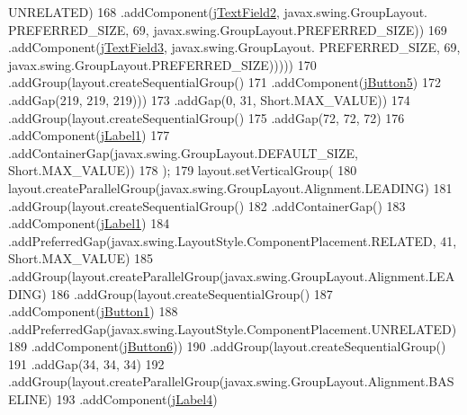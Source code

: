 \begin{DoxyCode}
      UNRELATED)
168                                         .addComponent(\mbox{\hyperlink{class_interfaz_package_1_1_consulta_busqueda_aa92702c5bdc2128ce8e45ce2edd99543}{jTextField2}}, javax.swing.GroupLayout.
      PREFERRED\_SIZE, 69, javax.swing.GroupLayout.PREFERRED\_SIZE))
169                                     .addComponent(\mbox{\hyperlink{class_interfaz_package_1_1_consulta_busqueda_a1898d78ec07cfb8e5e74b50bce3e6239}{jTextField3}}, javax.swing.GroupLayout.
      PREFERRED\_SIZE, 69, javax.swing.GroupLayout.PREFERRED\_SIZE)))))
170                     .addGroup(layout.createSequentialGroup()
171                         .addComponent(\mbox{\hyperlink{class_interfaz_package_1_1_consulta_busqueda_a92a758e63cc825dd1292869d625115dd}{jButton5}})
172                         .addGap(219, 219, 219)))
173                 .addGap(0, 31, Short.MAX\_VALUE))
174             .addGroup(layout.createSequentialGroup()
175                 .addGap(72, 72, 72)
176                 .addComponent(\mbox{\hyperlink{class_interfaz_package_1_1_consulta_busqueda_a53ca3d311b9b50620390029bffe04529}{jLabel1}})
177                 .addContainerGap(javax.swing.GroupLayout.DEFAULT\_SIZE, Short.MAX\_VALUE))
178         );
179         layout.setVerticalGroup(
180             layout.createParallelGroup(javax.swing.GroupLayout.Alignment.LEADING)
181             .addGroup(layout.createSequentialGroup()
182                 .addContainerGap()
183                 .addComponent(\mbox{\hyperlink{class_interfaz_package_1_1_consulta_busqueda_a53ca3d311b9b50620390029bffe04529}{jLabel1}})
184                 .addPreferredGap(javax.swing.LayoutStyle.ComponentPlacement.RELATED, 41, Short.MAX\_VALUE)
185                 .addGroup(layout.createParallelGroup(javax.swing.GroupLayout.Alignment.LEADING)
186                     .addGroup(layout.createSequentialGroup()
187                         .addComponent(\mbox{\hyperlink{class_interfaz_package_1_1_consulta_busqueda_a8cbb600ad394d0017b1f7fd24090eae5}{jButton1}})
188                         .addPreferredGap(javax.swing.LayoutStyle.ComponentPlacement.UNRELATED)
189                         .addComponent(\mbox{\hyperlink{class_interfaz_package_1_1_consulta_busqueda_a7cf19c14b7eb6a2bd1e460fcce0c2ffa}{jButton6}}))
190                     .addGroup(layout.createSequentialGroup()
191                         .addGap(34, 34, 34)
192                         .addGroup(layout.createParallelGroup(javax.swing.GroupLayout.Alignment.BASELINE)
193                             .addComponent(\mbox{\hyperlink{class_interfaz_package_1_1_consulta_busqueda_a2b841f08ba3d614049012b4b67130909}{jLabel4}})

\end{DoxyCode}
